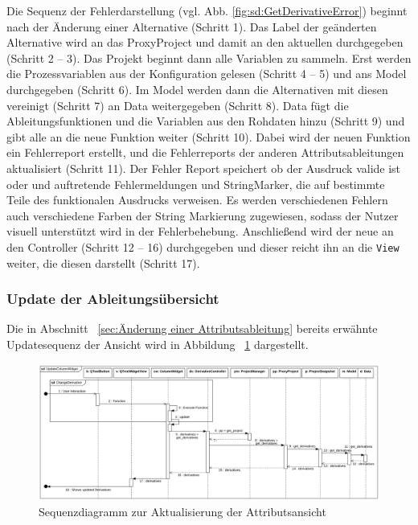 \documentclass{article}
\newcommand{\classref}[1]{\texttt{\nameref{cls:#1}}}
\begin{document}
Die Sequenz der Fehlerdarstellung (vgl. Abb. \ref{fig:sd:GetDerivativeError}) beginnt nach der Änderung einer Alternative (Schritt 1). Das Label der geänderten Alternative wird an das ProxyProject und damit an den aktuellen \classref{ProjectSnapshot} durchgegeben (Schritt 2 -- 3). Das Projekt beginnt dann alle Variablen zu sammeln. Erst werden die Prozessvariablen aus der Konfiguration gelesen (Schritt 4 -- 5) und ans Model durchgegeben (Schritt 6). Im Model werden dann die Alternativen mit diesen vereinigt (Schritt 7) an Data weitergegeben (Schritt 8). Data fügt die Ableitungsfunktionen und die Variablen aus den Rohdaten hinzu (Schritt 9) und gibt alle an die neue Funktion weiter (Schritt 10). Dabei wird der neuen Funktion ein Fehlerreport erstellt, und die Fehlerreports der anderen Attributsableitungen aktualisiert (Schritt 11). Der Fehler Report speichert ob der Ausdruck valide ist oder und auftretende Fehlermeldungen und StringMarker, die auf bestimmte Teile des funktionalen Ausdrucks verweisen. Es werden verschiedenen Fehlern auch verschiedene Farben der String Markierung zugewiesen, sodass der Nutzer visuell unterstützt wird in der Fehlerbehebung. Anschließend wird der neue \classref{ErrorReport} an den Controller (Schritt 12 -- 16) durchgegeben und dieser reicht ihn an die \texttt{View} weiter, die diesen darstellt (Schritt 17).

\subsubsection{Update der Ableitungsübersicht}\label{sec:Update der Ableitungsübersicht}
Die in Abschnitt ~\ref{sec:Änderung einer Attributsableitung} bereits erwähnte Updatesequenz der Ansicht wird in Abbildung ~\ref{fig:sd:UpdateColumnWidgetSequenceDiagram} dargestellt.

\begin{figure}[H]%
    \centering
    \includegraphics[width=13cm]{entwurf/Floriane/UpdateColumnWidget.png}
    \caption{Sequenzdiagramm zur Aktualisierung der Attributsansicht}
    \label{fig:sd:UpdateColumnWidgetSequenceDiagram}
\end{figure}
\end{document}
